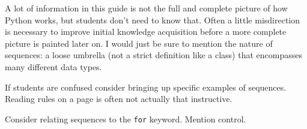 \begin{guide}
A lot of information in this guide is not the full and complete picture of how Python works, but students don't need to know that. Often a little misdirection is necessary to improve initial knowledge acquisition before a more complete picture is painted later on. I would just be sure to mention the nature of sequences: a loose umbrella (not a strict definition like a class) that encompasses many different data types. 

If students are confused consider bringing up specific examples of sequences. Reading rules on a page is often not actually that instructive. 

Consider relating sequences to the \lstinline{for} keyword. Mention control.
\end{guide}
